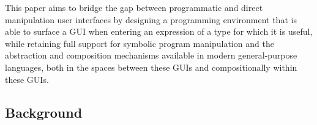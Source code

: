 
This paper aims to bridge the gap between
programmatic and direct manipulation user interfaces by designing 
a programming environment that
is able to surface a GUI when entering an expression of a type for which
it is useful, while retaining full support for symbolic program manipulation
and the abstraction and composition mechanisms
available in modern general-purpose languages, both   
in the spaces between these GUIs and compositionally within these GUIs.

\subsection{Background}\label{sec:background}

